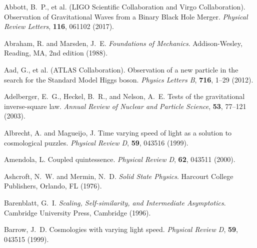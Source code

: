 \documentclass[12pt,a4paper]{article}
\begin{document}
	
	\begin{thebibliography}{99}
		
		Abbott, B.~P., et al. (LIGO Scientific Collaboration and Virgo Collaboration).
		\newblock Observation of Gravitational Waves from a Binary Black Hole Merger.
		\newblock \textit{Physical Review Letters}, \textbf{116}, 061102 (2017).
		\newblock {}
		
		Abraham, R. and Marsden, J.~E.
		\newblock \textit{Foundations of Mechanics}.
		\newblock Addison-Wesley, Reading, MA, 2nd edition (1988).
		
		Aad, G., et al. (ATLAS Collaboration).
		\newblock Observation of a new particle in the search for the Standard Model Higgs boson.
		\newblock \textit{Physics Letters B}, \textbf{716}, 1--29 (2012).
		\newblock {}
		
		Adelberger, E.~G., Heckel, B.~R., and Nelson, A.~E.
		\newblock Tests of the gravitational inverse-square law.
		\newblock \textit{Annual Review of Nuclear and Particle Science}, \textbf{53}, 77--121 (2003).
		\newblock {}
		
		Albrecht, A. and Magueijo, J.
		\newblock Time varying speed of light as a solution to cosmological puzzles.
		\newblock \textit{Physical Review D}, \textbf{59}, 043516 (1999).
		\newblock {}
		
		Amendola, L.
		\newblock Coupled quintessence.
		\newblock \textit{Physical Review D}, \textbf{62}, 043511 (2000).
		\newblock {}
		
		Ashcroft, N.~W. and Mermin, N.~D.
		\newblock \textit{Solid State Physics}.
		\newblock Harcourt College Publishers, Orlando, FL (1976).
		
		Barenblatt, G.~I.
		\newblock \textit{Scaling, Self-similarity, and Intermediate Asymptotics}.
		\newblock Cambridge University Press, Cambridge (1996).
		
		Barrow, J.~D.
		\newblock Cosmologies with varying light speed.
		\newblock \textit{Physical Review D}, \textbf{59}, 043515 (1999).
		\newblock {}
		

\end{thebibliography}
\end{document}
